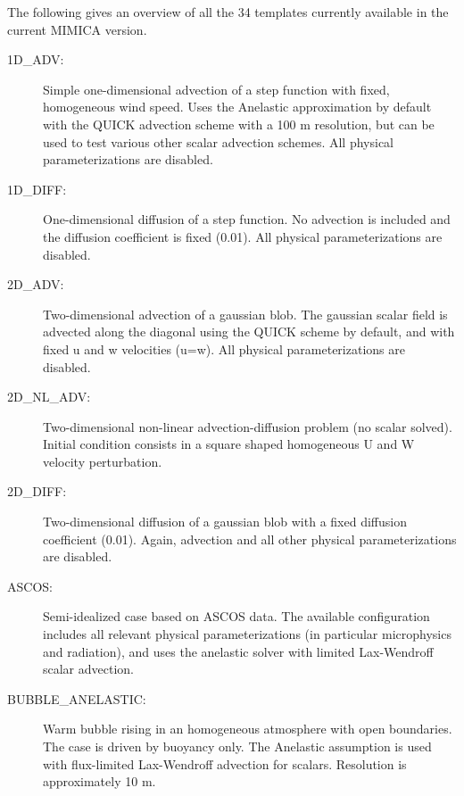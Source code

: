 \documentclass[12pt,A4,french]{article}
\begin{document}
The following gives an overview of all the 34 templates currently available in the current MIMICA version.

\begin{description}

\item[1D\_ADV:]

Simple one-dimensional advection of a step function with fixed, homogeneous wind speed. Uses the Anelastic approximation by default with the QUICK advection scheme with a 100 m resolution, but can be used to test various other scalar advection schemes. All physical parameterizations are disabled.

\item[1D\_DIFF:] 

One-dimensional diffusion of a step function. No advection is included and the diffusion coefficient is fixed (0.01). All physical parameterizations are disabled.

\item[2D\_ADV:]

Two-dimensional advection of a gaussian blob. The gaussian scalar field is advected along the diagonal using the QUICK scheme by default, and with fixed u and w velocities (u=w). All physical parameterizations are disabled.

\item[2D\_NL\_ADV:]

Two-dimensional non-linear advection-diffusion problem (no scalar solved). Initial condition consists in a square shaped homogeneous U and W velocity perturbation. 

\item[2D\_DIFF:]

Two-dimensional diffusion of a gaussian blob with a fixed diffusion coefficient (0.01). Again, advection and all other physical parameterizations are disabled.

\item[ASCOS:]

Semi-idealized case based on ASCOS data. The available configuration includes all relevant physical parameterizations (in particular microphysics and radiation), and uses the anelastic solver with limited Lax-Wendroff scalar advection.

\item[BUBBLE\_ANELASTIC:]

Warm bubble rising in an homogeneous atmosphere with open boundaries. The case is driven by buoyancy only. The Anelastic assumption is used with flux-limited Lax-Wendroff advection for scalars. Resolution is approximately 10 m.


\end{description}
\end{document}

